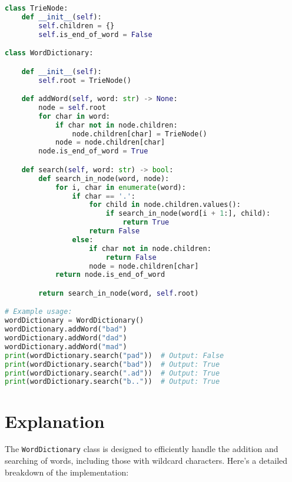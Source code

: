 \begin{fullwidth}
\begin{lstlisting}[language=Python]
class TrieNode:
    def __init__(self):
        self.children = {}
        self.is_end_of_word = False

class WordDictionary:

    def __init__(self):
        self.root = TrieNode()

    def addWord(self, word: str) -> None:
        node = self.root
        for char in word:
            if char not in node.children:
                node.children[char] = TrieNode()
            node = node.children[char]
        node.is_end_of_word = True

    def search(self, word: str) -> bool:
        def search_in_node(word, node):
            for i, char in enumerate(word):
                if char == '.':
                    for child in node.children.values():
                        if search_in_node(word[i + 1:], child):
                            return True
                    return False
                else:
                    if char not in node.children:
                        return False
                    node = node.children[char]
            return node.is_end_of_word

        return search_in_node(word, self.root)

# Example usage:
wordDictionary = WordDictionary()
wordDictionary.addWord("bad")
wordDictionary.addWord("dad")
wordDictionary.addWord("mad")
print(wordDictionary.search("pad"))  # Output: False
print(wordDictionary.search("bad"))  # Output: True
print(wordDictionary.search(".ad"))  # Output: True
print(wordDictionary.search("b.."))  # Output: True
\end{lstlisting}
\end{fullwidth}

\section*{Explanation}

The \texttt{WordDictionary} class is designed to efficiently handle the addition and searching of words, including those with wildcard characters. Here's a detailed breakdown of the implementation:

